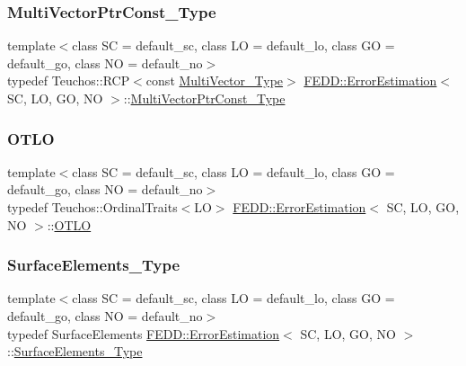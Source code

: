 \subsubsection{\texorpdfstring{Multi\+Vector\+Ptr\+Const\+\_\+\+Type}{MultiVectorPtrConst\_Type}}
{\footnotesize\ttfamily template$<$class SC  = default\+\_\+sc, class LO  = default\+\_\+lo, class GO  = default\+\_\+go, class NO  = default\+\_\+no$>$ \\
typedef Teuchos\+::\+R\+CP$<$const \hyperlink{classFEDD_1_1ErrorEstimation_a1c6fa9610a1e5e887e5a88ab33f1c792}{Multi\+Vector\+\_\+\+Type}$>$ \hyperlink{classFEDD_1_1ErrorEstimation}{F\+E\+D\+D\+::\+Error\+Estimation}$<$ SC, LO, GO, NO $>$\+::\hyperlink{classFEDD_1_1ErrorEstimation_af61aa23cb14996e497a1176d8fea650d}{Multi\+Vector\+Ptr\+Const\+\_\+\+Type}}

\mbox{\label{classFEDD_1_1ErrorEstimation_a1b356a52ad66b086de32457a51104038}} 
\subsubsection{\texorpdfstring{O\+T\+LO}{OTLO}}
{\footnotesize\ttfamily template$<$class SC  = default\+\_\+sc, class LO  = default\+\_\+lo, class GO  = default\+\_\+go, class NO  = default\+\_\+no$>$ \\
typedef Teuchos\+::\+Ordinal\+Traits$<$LO$>$ \hyperlink{classFEDD_1_1ErrorEstimation}{F\+E\+D\+D\+::\+Error\+Estimation}$<$ SC, LO, GO, NO $>$\+::\hyperlink{classFEDD_1_1ErrorEstimation_a1b356a52ad66b086de32457a51104038}{O\+T\+LO}}

\mbox{\label{classFEDD_1_1ErrorEstimation_a0d0800ed536b01a9a4873d0b3508d97a}} 
\subsubsection{\texorpdfstring{Surface\+Elements\+\_\+\+Type}{SurfaceElements\_Type}}
{\footnotesize\ttfamily template$<$class SC  = default\+\_\+sc, class LO  = default\+\_\+lo, class GO  = default\+\_\+go, class NO  = default\+\_\+no$>$ \\
typedef Surface\+Elements \hyperlink{classFEDD_1_1ErrorEstimation}{F\+E\+D\+D\+::\+Error\+Estimation}$<$ SC, LO, GO, NO $>$\+::\hyperlink{classFEDD_1_1ErrorEstimation_a0d0800ed536b01a9a4873d0b3508d97a}{Surface\+Elements\+\_\+\+Type}}

